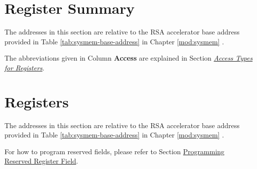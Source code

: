 \documentclass[main\_\_EN.tex]{subfiles}
\begin{document}
\section{Register Summary}
\label{sec:rsa-reg-summ}


The addresses in this section are relative to the RSA accelerator base address provided in Table \ref{tab:sysmem-base-address} in Chapter \ref{mod:sysmem} \textit{}.

The abbreviations given in Column \textbf{Access} are explained in Section \hyperref[glossary-access-types]{\textit{Access Types for Registers}}.





\newpage
\section{Registers}

The addresses in this section are relative to the RSA accelerator base address provided in Table \ref{tab:sysmem-base-address} in Chapter \ref{mod:sysmem} \textit{}.

For how to program reserved fields, please refer to Section \hyperref[programming-reserved-field]{Programming Reserved Register Field}.



\end{document}
